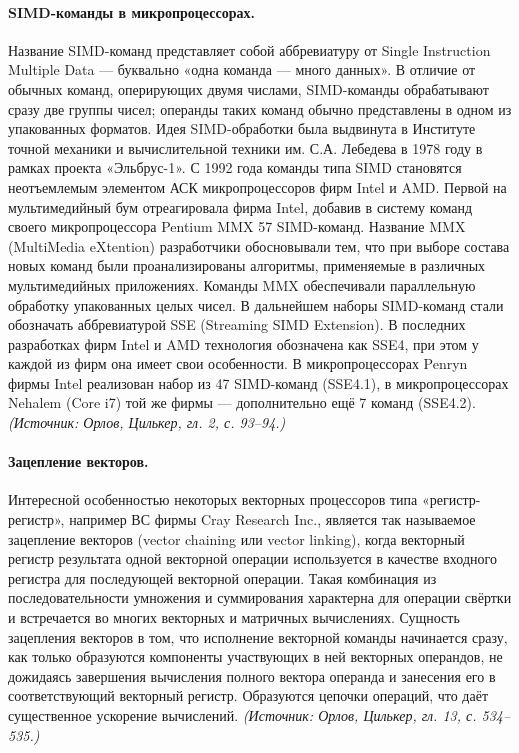\documentclass[a4paper,12pt]{article}
\begin{document}
\paragraph{SIMD-команды в микропроцессорах.}
Название SIMD-команд представляет собой аббревиатуру от Single Instruction Multiple Data --- буквально «одна команда --- много данных». В отличие от обычных команд, оперирующих двумя числами, SIMD-команды обрабатывают сразу две группы чисел; операнды таких команд обычно представлены в одном из упакованных форматов. Идея SIMD-обработки была выдвинута в Институте точной механики и вычислительной техники им. С.А. Лебедева в 1978 году в рамках проекта «Эльбрус-1». С 1992 года команды типа SIMD становятся неотъемлемым элементом АСК микропроцессоров фирм Intel и AMD. Первой на мультимедийный бум отреагировала фирма Intel, добавив в систему команд своего микропроцессора Pentium MMX 57 SIMD-команд. Название MMX (MultiMedia eXtention) разработчики обосновывали тем, что при выборе состава новых команд были проанализированы алгоритмы, применяемые в различных мультимедийных приложениях. Команды MMX обеспечивали параллельную обработку упакованных целых чисел. В дальнейшем наборы SIMD-команд стали обозначать аббревиатурой SSE (Streaming SIMD Extension). В последних разработках фирм Intel и AMD технология обозначена как SSE4, при этом у каждой из фирм она имеет свои особенности. В микропроцессорах Penryn фирмы Intel реализован набор из 47 SIMD-команд (SSE4.1), в микропроцессорах Nehalem (Core i7) той же фирмы --- дополнительно ещё 7 команд (SSE4.2).
\textit{(Источник: Орлов, Цилькер, гл. 2, с. 93--94.)}

\paragraph{Зацепление векторов.}
Интересной особенностью некоторых векторных процессоров типа «регистр-регистр», например ВС фирмы Cray Research Inc., является так называемое зацепление векторов (vector chaining или vector linking), когда векторный регистр результата одной векторной операции используется в качестве входного регистра для последующей векторной операции. Такая комбинация из последовательности умножения и суммирования характерна для операции свёртки и встречается во многих векторных и матричных вычислениях. Сущность зацепления векторов в том, что исполнение векторной команды начинается сразу, как только образуются компоненты участвующих в ней векторных операндов, не дожидаясь завершения вычисления полного вектора операнда и занесения его в соответствующий векторный регистр. Образуются цепочки операций, что даёт существенное ускорение вычислений.
\textit{(Источник: Орлов, Цилькер, гл. 13, с. 534--535.)}
\end{document}
